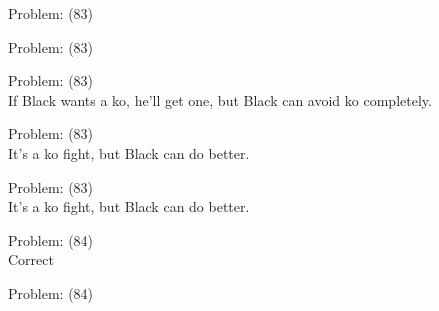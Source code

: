 \documentclass[11pt]{article}
\begin{document}
\begin{minipage}[t]{0.5\textwidth}
  {\centering
  
  Problem: (83)\\
  
  }
\end{minipage}
\begin{minipage}[t]{0.5\textwidth}
  {\centering
  
  Problem: (83)\\
  
  }
\end{minipage}
\begin{minipage}[t]{0.5\textwidth}
  {\centering
  
  Problem: (83)\\
  If Black wants a ko, he'll get one, but Black can avoid ko completely.\\
  }
\end{minipage}
\begin{minipage}[t]{0.5\textwidth}
  {\centering
  
  Problem: (83)\\
  It's a ko fight, but Black can do better.\\
  }
\end{minipage}
\begin{minipage}[t]{0.5\textwidth}
  {\centering
  
  Problem: (83)\\
  It's a ko fight, but Black can do better.\\
  }
\end{minipage}
\begin{minipage}[t]{0.5\textwidth}
  {\centering
  
  Problem: (84)\\
  Correct\\
  }
\end{minipage}
\begin{minipage}[t]{0.5\textwidth}
  {\centering
  
  Problem: (84)\\
  
  }
\end{minipage}
\end{document}

